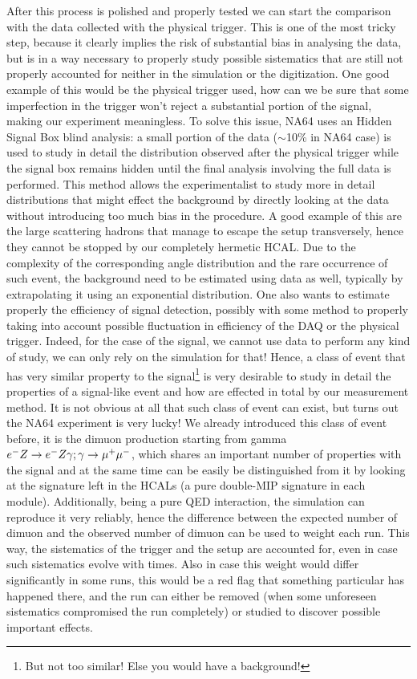 After this process is polished and properly tested we can start the comparison with the data collected with the physical trigger. This is one of the most tricky step, because it clearly implies the risk of substantial bias in analysing the data, but is in a way necessary to properly study possible sistematics that are still not properly accounted for neither in the simulation or the digitization. One good example of this would be the physical trigger used, how can we be sure that some imperfection in the trigger won't reject a substantial portion of the signal, making our experiment meaningless. To solve this issue, NA64 uses an Hidden Signal Box blind analysis\cite{blind-analysis}: a small portion of the data ($\sim$10\% in NA64 case) is used to study in detail the distribution observed after the physical trigger while the signal box remains hidden until the final analysis involving the full data is performed. This method allows the experimentalist to study more in detail distributions that might effect the background by directly looking at the data without introducing too much bias in the procedure. A good example of this are the large scattering hadrons that manage to escape the setup transversely, hence they cannot be stopped by our completely hermetic HCAL. Due to the complexity of the corresponding angle distribution and the rare occurrence of such event, the background need to be estimated using data as well, typically by extrapolating it using an exponential distribution. One also wants to estimate properly the efficiency of signal detection, possibly with some method to properly taking into account possible fluctuation in efficiency of the DAQ or the physical trigger. Indeed, for the case of the signal, we cannot use data to perform any kind of study, we can only rely on the simulation for that! Hence, a class of event that has very similar property to the signal\footnote{But not too similar! Else you would have a background!} is very desirable to study in detail the properties of a signal-like event and how are effected in total by our measurement method. It is not obvious at all that such class of event can exist, but turns out the NA64 experiment is very lucky! We already introduced this class of event before, it is the dimuon production starting from gamma $e^- Z \to e^- Z \gamma; \gamma \to \mu^+ \mu^-$, which shares an important number of properties with the signal and at the same time can be easily be distinguished from it by looking at the signature left in the HCALs (a pure double-MIP signature in each module). Additionally, being a pure QED interaction, the simulation can reproduce it very reliably, hence the difference between the expected number of dimuon and the observed number of dimuon can be used to weight each run. This way, the sistematics of the trigger and the setup are accounted for, even in case such sistematics evolve with times. Also in case this weight would differ significantly in some runs, this would be a red flag that something particular has happened there, and the run can either be removed (when some unforeseen sistematics compromised the run completely) or studied to discover possible important effects.


